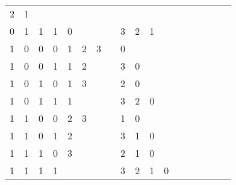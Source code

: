\begin{table}[htbp]
\begin{minipage}{.4\textwidth}
\begin{tabular}{cccccccccccccccccc}
			\multicolumn{1}{c}{2} & \multicolumn{1}{c}{1} & \multicolumn{1}{c}{}& \multicolumn{1}{c}{} \\
			\multicolumn{1}{c}{0} & \multicolumn{1}{c}{1} & \multicolumn{1}{c}{1} & \multicolumn{1}{c}{1} & \multicolumn{1}{|c}{0} & \multicolumn{1}{c}{} & \multicolumn{1}{c}{}& \multicolumn{1}{c}{} &
			\multicolumn{1}{c}{3} & \multicolumn{1}{c}{2} & \multicolumn{1}{c}{1}& \multicolumn{1}{c}{} \\
			\multicolumn{1}{c}{1} & \multicolumn{1}{c}{0} & \multicolumn{1}{c}{0} & \multicolumn{1}{c}{0} & \multicolumn{1}{|c}{1} & \multicolumn{1}{c}{2} & \multicolumn{1}{c}{3}& \multicolumn{1}{c}{} &
			\multicolumn{1}{c}{0} & \multicolumn{1}{c}{} & \multicolumn{1}{c}{}& \multicolumn{1}{c}{} \\
			\multicolumn{1}{c}{1} & \multicolumn{1}{c}{0} & \multicolumn{1}{c}{0} & \multicolumn{1}{c}{1} & \multicolumn{1}{|c}{1} & \multicolumn{1}{c}{2} & \multicolumn{1}{c}{}& \multicolumn{1}{c}{} &
			\multicolumn{1}{c}{3} & \multicolumn{1}{c}{0} & \multicolumn{1}{c}{}& \multicolumn{1}{c}{} \\
			\multicolumn{1}{c}{1} & \multicolumn{1}{c}{0} & \multicolumn{1}{c}{1} & \multicolumn{1}{c}{0} & \multicolumn{1}{|c}{1} & \multicolumn{1}{c}{3} & \multicolumn{1}{c}{}& \multicolumn{1}{c}{} &
			\multicolumn{1}{c}{2} & \multicolumn{1}{c}{0} & \multicolumn{1}{c}{}& \multicolumn{1}{c}{} \\
			\multicolumn{1}{c}{1} & \multicolumn{1}{c}{0} & \multicolumn{1}{c}{1} & \multicolumn{1}{c}{1} & \multicolumn{1}{|c}{1} & \multicolumn{1}{c}{} & \multicolumn{1}{c}{}& \multicolumn{1}{c}{} &
			\multicolumn{1}{c}{3} & \multicolumn{1}{c}{2} & \multicolumn{1}{c}{0}& \multicolumn{1}{c}{} \\
			\multicolumn{1}{c}{1} & \multicolumn{1}{c}{1} & \multicolumn{1}{c}{0} & \multicolumn{1}{c}{0} & \multicolumn{1}{|c}{2} & \multicolumn{1}{c}{3} & \multicolumn{1}{c}{}& \multicolumn{1}{c}{} &
			\multicolumn{1}{c}{1} & \multicolumn{1}{c}{0} & \multicolumn{1}{c}{}& \multicolumn{1}{c}{} \\
			\multicolumn{1}{c}{1} & \multicolumn{1}{c}{1} & \multicolumn{1}{c}{0} & \multicolumn{1}{c}{1} & \multicolumn{1}{|c}{2} & \multicolumn{1}{c}{} & \multicolumn{1}{c}{}& \multicolumn{1}{c}{} &
			\multicolumn{1}{c}{3} & \multicolumn{1}{c}{1} & \multicolumn{1}{c}{0}& \multicolumn{1}{c}{} \\
			\multicolumn{1}{c}{1} & \multicolumn{1}{c}{1} & \multicolumn{1}{c}{1} & \multicolumn{1}{c}{0} & \multicolumn{1}{|c}{3} & \multicolumn{1}{c}{} & \multicolumn{1}{c}{}& \multicolumn{1}{c}{} &
			\multicolumn{1}{c}{2} & \multicolumn{1}{c}{1} & \multicolumn{1}{c}{0}& \multicolumn{1}{c}{} \\
			\multicolumn{1}{c}{1} & \multicolumn{1}{c}{1} & \multicolumn{1}{c}{1} & \multicolumn{1}{c}{1} & \multicolumn{1}{|c}{} & \multicolumn{1}{c}{} & \multicolumn{1}{c}{}& \multicolumn{1}{c}{} &
			\multicolumn{1}{c}{3} & \multicolumn{1}{c}{2} & \multicolumn{1}{c}{1}& \multicolumn{1}{c}{0} \\
			

\end{tabular}
\end{minipage}
\end{table}
